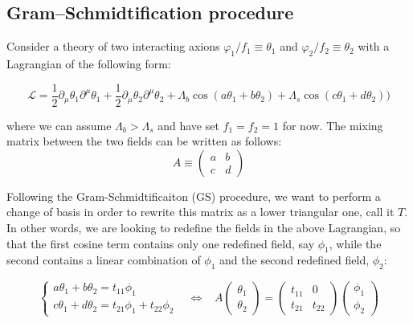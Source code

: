 \documentclass{article}
\begin{document}
\subsection{Gram–Schmidtification procedure}
\label{subsec:GS-2-axions}
Consider a theory of two interacting axions $\varphi_1/f_1\equiv\theta_1$ and $\varphi_2/f_2\equiv\theta_2$ with a Lagrangian of the following form:

\begin{equation}
    \label{eq:pre-GS-potential}
    \mathcal{L} = \frac{1}{2}\partial_\mu\theta_1 \partial^\mu\theta_1  + \frac{1}{2}\partial_\mu\theta_2 \partial^\mu\theta_2  + \Lambda_{b}\cos{(a\theta_1+b\theta_2)}+\Lambda_{s}\cos{(c\theta_1+d\theta_2))}
\end{equation}

\noindent where we can assume $\Lambda_b>\Lambda_s$ and have set $f_1 = f_2 = 1$ for now. The mixing matrix between the two fields can be written as follows:
\begin{equation}
A \equiv
    \begin{pmatrix}
    a & b\\
    c & d
    \end{pmatrix}
\end{equation}

Following the Gram-Schmidtificaiton (GS) procedure, we want to perform a change of basis in order to rewrite this  matrix as a lower triangular one, call it $T$. In other words, we are looking to redefine the fields in the above Lagrangian, so that the first cosine term contains only one redefined field, say $\phi_1$, while the second contains a linear combination of  $\phi_1$ and the second redefined field, $\phi_2$:

\begin{equation}
    \label{eq:triang}
    \begin{cases}
        a\theta_1+b\theta_2 = t_{11} \phi_1 \\ 
        c\theta_1+d\theta_2 = t_{21} \phi_1 + t_{22} \phi_2
    \end{cases} \,\,\,\,\,
    \Leftrightarrow \,\,\,\,\,
    A \begin{pmatrix}
        \theta_1 \\
        \theta_2
    \end{pmatrix}
    = 
    \begin{pmatrix}
        t_{11} & 0 \\
        t_{21} &t_{22} 
    \end{pmatrix} 
    \begin{pmatrix}
        \phi_1 \\
        \phi_2
    \end{pmatrix}
\end{equation}
\end{document}
